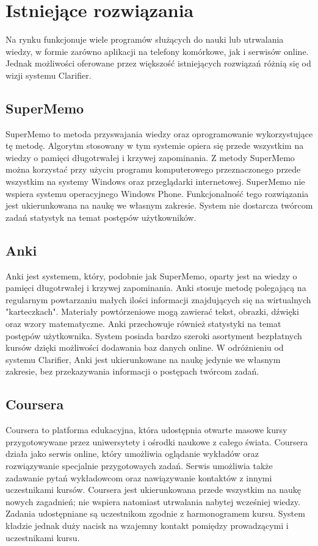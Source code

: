 \documentclass{pracamgr}
\begin{document}
\section{Istniejące rozwiązania}
Na rynku funkcjonuje wiele programów służących do nauki lub utrwalania wiedzy, w formie zarówno aplikacji na telefony komórkowe, jak i serwisów online. Jednak możliwości oferowane przez większość istniejących rozwiązań różnią się od wizji systemu Clarifier.

\subsection{SuperMemo}
SuperMemo to metoda przyswajania wiedzy oraz oprogramowanie wykorzystujące tę metodę. Algorytm stosowany w tym systemie opiera się przede wszystkim na wiedzy o pamięci długotrwałej i krzywej zapominania. Z metody SuperMemo można korzystać przy użyciu programu komputerowego przeznaczonego przede wszystkim na systemy Windows oraz przeglądarki internetowej. SuperMemo nie wspiera systemu operacyjnego Windows Phone. Funkcjonalność tego rozwiązania jest ukierunkowana na naukę we własnym zakresie. System nie dostarcza twórcom zadań statystyk na temat postępów użytkowników.  

\subsection{Anki}
Anki jest systemem, który, podobnie jak SuperMemo, oparty jest na wiedzy o pamięci długotrwałej i krzywej zapominania. Anki stosuje metodę polegającą na regularnym powtarzaniu małych ilości informacji znajdujących się na wirtualnych "karteczkach". Materiały powtórzeniowe mogą zawierać tekst, obrazki, dźwięki oraz wzory matematyczne. Anki przechowuje również statystyki na temat postępów użytkownika. System posiada bardzo szeroki asortyment bezpłatnych kursów dzięki możliwości dodawania baz danych online. W odróżnieniu od systemu Clarifier, Anki jest ukierunkowane na naukę jedynie we własnym zakresie, bez przekazywania informacji o postępach twórcom zadań.  

\subsection{Coursera}
Coursera to platforma edukacyjna, która udostępnia otwarte masowe kursy przygotowywane przez uniwersytety i ośrodki naukowe z całego świata. Coursera działa jako serwis online, który umożliwia oglądanie wykładów oraz rozwiązywanie specjalnie przygotowaych zadań. Serwis umożliwia także zadawanie pytań wykładowcom oraz nawiązywanie kontaktów z innymi uczestnikami kursów. Coursera jest ukierunkowana przede wszystkim na naukę nowych zagadnień; nie wspiera natomiast utrwalania nabytej wcześniej wiedzy. Zadania udostępniane są uczestnikom zgodnie z harmonogramem kursu. System kładzie jednak duży nacisk na wzajemny kontakt pomiędzy prowadzącymi i uczestnikami kursu. 
\end{document}
